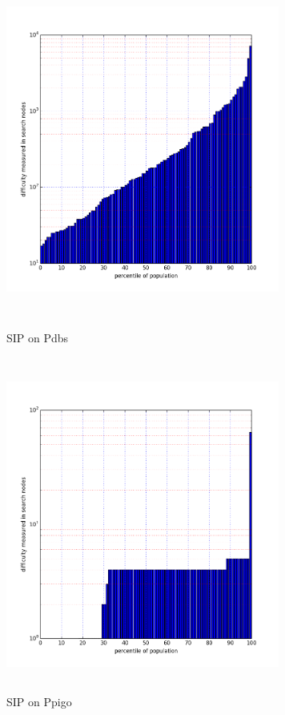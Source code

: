 \documentclass{l4proj}
\begin{document}
\begin{figure}
\centering
\begin{minipage}[t]{.5\textwidth}
  \centering
  \includegraphics[height=11cm,width=9cm]{images/plots/pdbsPercentileLog.png}
  \caption{SIP on Pdbs}
  \label{pdbsNodes}
\end{minipage}%
\begin{minipage}[t]{.5\textwidth}
  \centering
  \includegraphics[height=11cm,width=9cm]{images/plots/ppigoPercentileLog.png}
  \caption{SIP on Ppigo}
  \label{ppigoNodes}
\end{minipage}
\end{figure}
\end{document}
